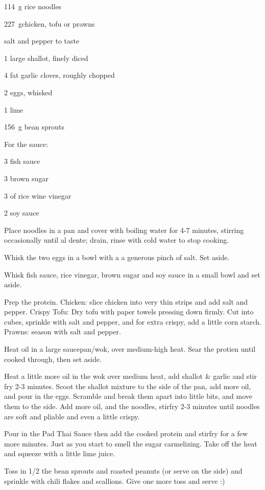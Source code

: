 \label{recipe:pad_thai}


\begin{ingredients}

  \item \SI{114}{\gram} rice noodles
  \item \SI{227}{\gram}chicken, tofu or prawns
  \item salt and pepper to taste
  \item 1 large shallot, finely diced
  \item 4 fat garlic cloves, roughly chopped
  \item 2 eggs, whisked
  \item 1 lime
  \item \SI{156}{\gram} bean sprouts
  \item For the sauce:
  \item \SI{3}{\tablespoon} fish sauce
  \item \SI{3}{\tablespoon} brown sugar
  \item \SI{3}{\tablespoon} of rice wine vinegar
  \item \SI{2}{\teaspoon} soy sauce
\end{ingredients}


\begin{method}
  	Place noodles in a pan and cover with boiling water for 4-7 minutes, stirring occasionally until al dente;
drain, rinse with cold water to stop cooking. 

	Whisk the two eggs in a bowl with a a generous pinch of salt. Set aside.
	
	Whisk fish sauce,  rice vinegar, brown sugar and soy sauce in a small bowl and set aside.
	
	Prep the protein. Chicken: slice chicken into very thin strips and add salt and pepper. Crispy Tofu: Dry
tofu with paper towels pressing down firmly. Cut into cubes, sprinkle with salt and pepper, and for extra
crispy, add a little corn starch. Prawns: season with salt and pepper.

	Heat oil in a large saucepan/wok, over medium-high heat. Sear the protien until cooked through, then
set aside. 

	Heat a little more oil in the wok over medium heat, add shallot \& garlic and stir fry 2-3 minutes.  Scoot
the shallot mixture to the side of the pan, add more oil, and pour in the eggs. Scramble and break them
apart into little bits, and move them to the side. Add more oil, and the noodles, stirfry 2-3 minutes until
noodles are soft and pliable and even a little crispy. 

	Pour in the Pad Thai Sauce then add the cooked protein and stirfry for a few more minutes. Just as you
start to smell the sugar carmelizing. Take off the heat and squeeze with a little lime juice. 

	Toss in 1/2 the bean sprouts and roasted peanuts (or serve on the side) and sprinkle with chili flakes and
scallions. Give one more toss and serve :)

  
\end{method}


